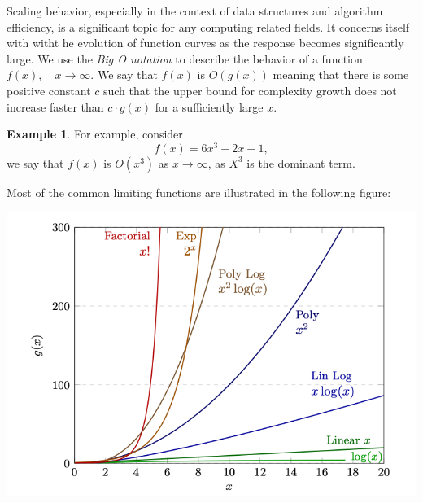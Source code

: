\documentclass[12pt]{article}
\theoremstyle{definition}
\newtheorem*{example}{Example}
\begin{document}
Scaling behavior, especially in the context of data structures and algorithm efficiency, is a significant topic for any computing related fields. It concerns itself with witht he evolution of function curves as the response becomes significantly large. We use the \emph{Big O notation} to describe the behavior of a function $f(x), \quad x \rightarrow \infty$. We say that $f(x)$ is $O(g(x))$ meaning that there is some positive constant $c$ such that the upper bound for complexity growth does not increase faster than $c \cdot g(x)$ for a sufficiently large $x$. 

\begin{example}
    For example, consider $$f(x) = 6x^3 + 2x + 1,$$ we say that $f(x)$ is $O(x^3)$ as $x \rightarrow \infty$, as $X^3$ is the dominant term.  
\end{example}


Most of the common limiting functions are illustrated in the following figure: 

\includegraphics[width=\textwidth]{4_func3}
\end{document}

